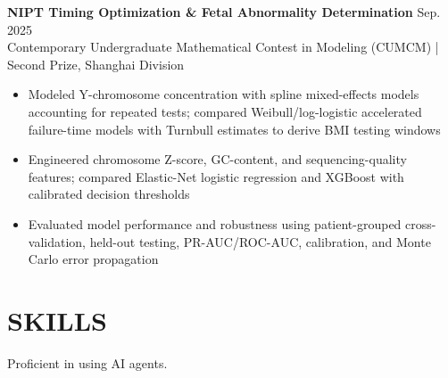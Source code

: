 \documentclass[a4paper,9pt]{extarticle}
\begin{document}
\noindent \textbf{NIPT Timing Optimization \& Fetal Abnormality Determination} \hfill Sep. 2025\\
\noindent Contemporary Undergraduate Mathematical Contest in Modeling (CUMCM) | Second Prize, Shanghai Division
\begin{itemize}
    \item Modeled Y-chromosome concentration with spline mixed-effects models accounting for repeated tests; compared Weibull/log-logistic accelerated failure-time models with Turnbull estimates to derive BMI testing windows
    \item Engineered chromosome Z-score, GC-content, and sequencing-quality features; compared Elastic-Net logistic regression and XGBoost with calibrated decision thresholds
    \item Evaluated model performance and robustness using patient-grouped cross-validation, held-out testing, PR-AUC/ROC-AUC, calibration, and Monte Carlo error propagation
\end{itemize}

\section*{SKILLS}
\noindent Proficient in using AI agents.
\end{document}

